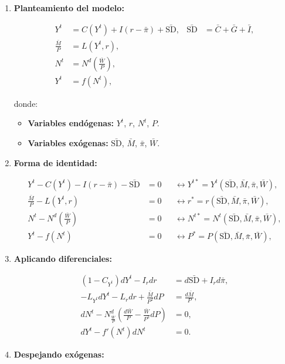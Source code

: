 \documentclass[
  doc,
  floatsintext,
  longtable,
  a4paper,
  nolmodern,
  notxfonts,
  notimes,
  12pt,
  colorlinks=true,linkcolor=blue,citecolor=blue,urlcolor=blue]{apa7}
\providecommand{\tightlist}{%
  \setlength{\itemsep}{0pt}\setlength{\parskip}{0pt}}
\begin{document}
\begin{enumerate}
\def\labelenumi{\arabic{enumi}.}
\item
  \textbf{Planteamiento del modelo:}

  \[
  \begin{aligned}
  Y^t &= C(Y^t) + I(r - \bar{\pi}) + \bar{\mathrm{SD}}, & \bar{\mathrm{SD}} &= \bar{C} + \bar{G} + \bar{I}, \\
  \frac{\bar{M}}{P} &= L(Y^t, r), \\
  N^t &= N^d \left( \frac{\bar{W}}{P} \right), \\
  Y^t &= f(N^t),
  \end{aligned}
  \]

  donde:

  \begin{itemize}
  \tightlist
  \item
    \textbf{Variables endógenas:} \(Y^t\), \(r\), \(N^t\), \(P\).
  \item
    \textbf{Variables exógenas:} \(\bar{\mathrm{SD}}\), \(\bar{M}\),
    \(\bar{\pi}\), \(\bar{W}\).
  \end{itemize}
\item
  \textbf{Forma de identidad:}

  \[
  \begin{aligned}
  Y^t - C(Y^t) - I(r - \bar{\pi}) - \bar{\mathrm{SD}} &= 0 & &\leftrightarrow Y^{t*} = Y^t(\bar{\mathrm{SD}}, \bar{M}, \bar{\pi}, \bar{W}), \\
  \frac{\bar{M}}{P} - L(Y^t, r) &= 0 & &\leftrightarrow r^* = r(\bar{\mathrm{SD}}, \bar{M}, \bar{\pi}, \bar{W}), \\
  N^t - N^d \left( \frac{\bar{W}}{P} \right) &= 0 & &\leftrightarrow N^{t*} = N^t(\bar{\mathrm{SD}}, \bar{M}, \bar{\pi}, \bar{W}), \\
  Y^t - f(N^t) &= 0 & &\leftrightarrow P^* = P(\bar{\mathrm{SD}}, \bar{M}, \bar{\pi}, \bar{W}),
  \end{aligned}
  \]
\item
  \textbf{Aplicando diferenciales:}

  \[
  \begin{aligned}
  (1 - C_{Y^t}) dY^t - I_r dr &= d\bar{\mathrm{SD}} + I_r d\bar{\pi}, \\
  -L_{Y^t} dY^t - L_r dr + \frac{\bar{M}}{P^2} dP &= \frac{d\bar{M}}{P}, \\
  dN^t - N^d_{\frac{\bar{W}}{P}} \left( \frac{d\bar{W}}{P} - \frac{\bar{W}}{P^2} dP \right) &= 0, \\
  dY^t - f'(N^t) dN^t &= 0.
  \end{aligned}
  \]
\item
  \textbf{Despejando exógenas:}


\end{enumerate}
\end{document}
